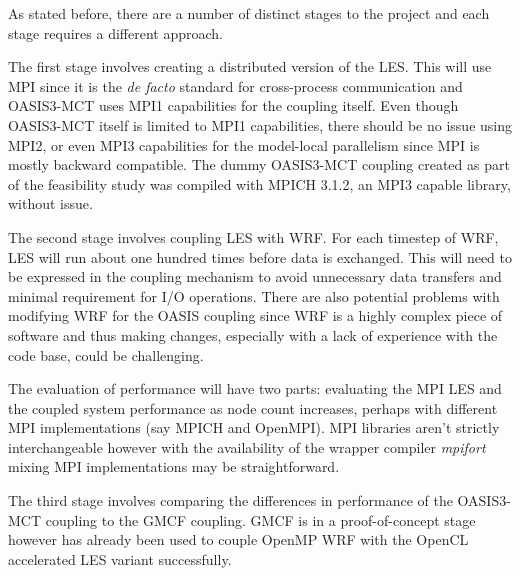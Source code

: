 As stated before, there are a number of distinct stages to the project and each
stage requires a different approach.

The first stage involves creating a distributed version of the LES. This will
use MPI since it is the \textit{de facto} standard for cross-process
communication and OASIS3-MCT uses MPI1 capabilities for the coupling itself.
Even though OASIS3-MCT itself is limited to MPI1 capabilities, there should be
no issue using MPI2, or even MPI3 capabilities for the model-local parallelism
since MPI is mostly backward compatible. The dummy OASIS3-MCT coupling created
as part of the feasibility study was compiled with MPICH 3.1.2, an MPI3 capable
library, without issue.

The second stage involves coupling LES with WRF. For each timestep of WRF, LES
will run about one hundred times before data is exchanged. This will need to be
expressed in the coupling mechanism to avoid unnecessary data transfers and
minimal requirement for I/O operations. There are also potential problems with
modifying WRF for the OASIS coupling since WRF is a highly complex piece of
software and thus making changes, especially with a lack of experience with the
code base, could be challenging.

The evaluation of performance will have two parts: evaluating the MPI LES and
the coupled system performance as node count increases, perhaps with different
MPI implementations (say MPICH and OpenMPI). MPI libraries aren't strictly
interchangeable however with the availability of the wrapper compiler
\textit{mpifort} mixing MPI implementations may be straightforward.

The third stage involves comparing the differences in performance of the
OASIS3-MCT coupling to the GMCF coupling. GMCF is in a proof-of-concept stage
however has already been used to couple OpenMP WRF with the OpenCL accelerated
LES variant successfully.
